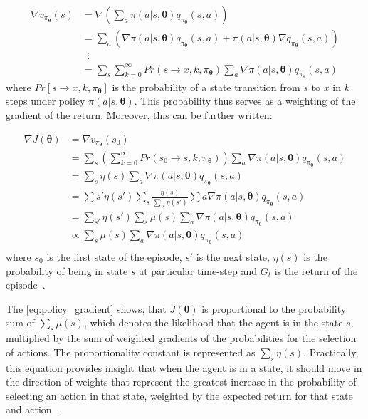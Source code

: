 \documentclass[../xlapes02]{subfiles}
\begin{document}
    \begin{equation}
        \begin{split}
            \nabla v_{\pi_{\bm{\theta}}}(s)&=\nabla\left(\sum_{a}\pi(a|s,\bm{\theta})q_{\pi_{\bm{\theta}}}(s,a)\right)\\
            &=\sum_{a}(\nabla\pi(a|s,\bm{\theta})q_{\pi_{\bm{\theta}}}(s,a)+\pi(a|s,\bm{\bm{\theta}})\nabla q_{\pi_{\bm{\theta}}}(s,a))\\
            &\mspace{10mu}\vdots\\
            &=\sum_{s}\sum_{k=0}^{\infty}Pr(s\rightarrow x,k,\pi_{\bm{\theta}})\sum_{a}\nabla\pi(a|s,\bm{\theta})q_{\pi_\theta}(s,a)
        \end{split}
    \end{equation}
    where $Pr\left[s \rightarrow x, k, \pi_{\bm{\theta}}\right]$ is the probability of a state transition from $s$ to $x$ in $k$ steps under policy $\pi(a | s, \bm{\theta})$. This probability thus serves as a weighting of the gradient of the return. Moreover, this can be further written:

    \begin{equation}
        \label{eq:policy_gradient}
        \begin{split}
            \nabla J(\bm{\theta})&=\nabla v_{\pi_{\bm{\theta}}}(s_0)\\
            &=\sum_{s}\left(\sum_{k=0}^{\infty}Pr(s_0\rightarrow s,k,\pi_{\bm{\theta}})\right)\sum_{a}\nabla\pi(a|s,\bm{\theta})q_{\pi_{\bm{\theta}}}(s,a)\\
            &=\sum_{s}\eta(s)\sum_{a}\nabla\pi(a|s,\bm{\theta})q_{\pi_{\bm{\theta}}}(s,a)\\
            &=\sum{s'}\eta(s')\sum_{s}\frac{\eta(s)}{\sum_{'s}\eta(s')}\sum{a}\nabla\pi(a|s,\bm{\theta})q_{\pi_{\bm{\theta}}}(s,a)\\
            &=\sum_{s'}\eta(s')\sum_{s}\mu(s)\sum_{a}\nabla\pi(a|s,\bm{\theta})q_{\pi_{\bm{\theta}}}(s,a)\\
            &\propto\sum_{s}\mu(s)\sum_{a}\nabla\pi(a|s,\bm{\theta})q_{\pi_{\bm{\theta}}}(s,a)\\
        \end{split}
    \end{equation}
    where $s_0$ is the first state of the episode, $s'$ is the next state, $\eta(s)$ is the probability of being in state $s$ at particular time-step and $G_t$ is the return of the episode~\cite{sutton2018reinforcement, FITMT25127}.

    The \cref{eq:policy_gradient} shows, that $J(\bm{\theta})$ is proportional to the probability sum of $\sum_s \mu(s)$, which denotes the likelihood that the agent is in the state $s$, multiplied by the sum of weighted gradients of the probabilities for the selection of actions. The proportionality constant is represented as $\sum_s \eta(s)$. Practically, this equation provides insight that when the agent is in a state, it should move in the direction of weights that represent the greatest increase in the probability of selecting an action in that state, weighted by the expected return for that state and action~\cite{FITMT25127}.
\end{document}
